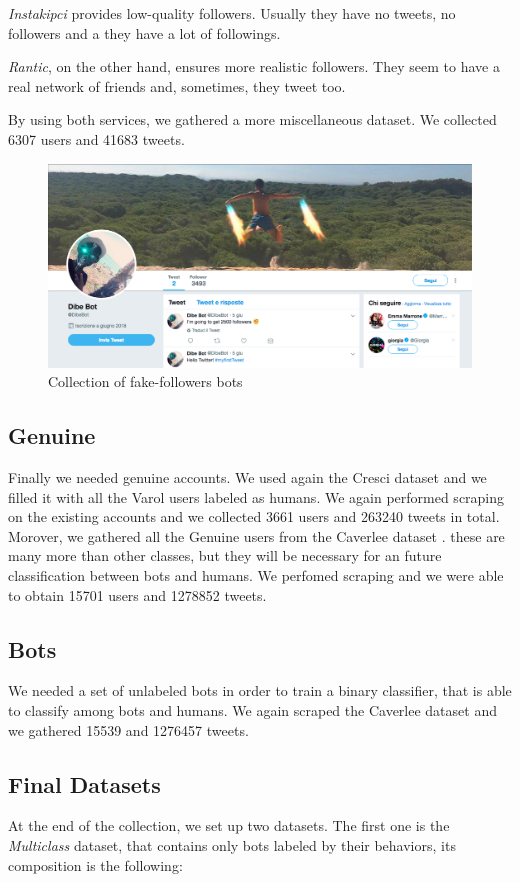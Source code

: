 \emph{Instakipci} provides low-quality followers. Usually they have no tweets, no followers and a they have a lot of followings.

\emph{Rantic}, on the other hand, ensures more realistic followers. They seem to have a real network of friends and, sometimes, they tweet too.

By using both services, we gathered a more miscellaneous dataset.
We collected 6307 users and 41683 tweets.
\begin{figure}
	\centering
	\includegraphics[width=\columnwidth]{chapter3/figure/dibebot.png}
	\caption{Collection of fake-followers bots}
	\label{fig:dibebot}
\end{figure}

\subsection{Genuine}
Finally we needed genuine accounts. We used again the Cresci dataset \cite{Cresci} and we filled it with all the Varol users labeled as humans. We again performed scraping on the existing accounts and we collected 3661 users and 263240 tweets in total.
Morover, we gathered all the Genuine users from the Caverlee dataset \cite{Lee11sevenmonths}. these are many more than other classes, but they will be necessary for an future classification between bots and humans. We perfomed scraping and we were able to obtain 15701 users and 1278852 tweets.

\subsection{Bots}
We needed a set of unlabeled bots in order to train a binary classifier, that is able to classify among bots and humans. We again scraped the Caverlee dataset \cite{Lee11sevenmonths} and we gathered 15539 and 1276457 tweets.

\subsection{Final Datasets}
At the end of the collection, we set up two datasets. The first one is the \textit{Multiclass} dataset, that contains only bots labeled by their behaviors, its composition is the following:

